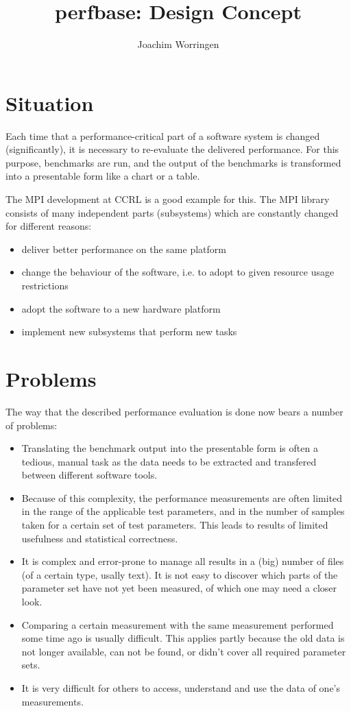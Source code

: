 \documentclass[12pt,a4paper]{article}
\author{Joachim Worringen}
\title{perfbase: Design Concept}
\begin{document}
\maketitle


\section{Situation}
Each time that a performance-critical part of a software
system is changed (significantly), it is necessary to re-evaluate the
delivered performance. For this purpose, benchmarks are run, and the
output of the benchmarks is transformed into a presentable form like a
chart or a table.

The MPI development at CCRL is a good example for this. The MPI
library consists of many independent parts (subsystems) which are
constantly changed for different reasons:
\begin{itemize}
\item deliver better performance on the same platform
\item change the behaviour of the software, i.e. to adopt to given resource 
  usage restrictions
\item adopt the software to a new hardware platform
\item implement new subsystems that perform new tasks
\end{itemize} 

\section{Problems}
The way that the described performance evaluation is done
now bears a number of problems:
\begin{itemize}
\item Translating the benchmark output into the presentable form is often
  a tedious, manual task as the data needs to be extracted and transfered
  between different software tools.
\item Because of this complexity, the performance measurements are often
  limited in the range of the applicable test parameters, and in the 
  number of samples taken for a certain set of test parameters. This
  leads to results of limited usefulness and statistical correctness.
\item It is complex and error-prone to manage all results in a (big) number of
  files (of a certain type, usally text). It is not easy to discover
  which parts of the parameter set have not yet been measured, of which
  one may need a closer look.
\item Comparing a certain measurement with the same measurement performed
  some time ago is usually difficult. This applies partly because
  the old data is not longer available, can not be found, or didn't
  cover all required parameter sets.
\item It is very difficult for others to access, understand and use the 
  data of one's measurements.
\end{itemize}
\end{document}
